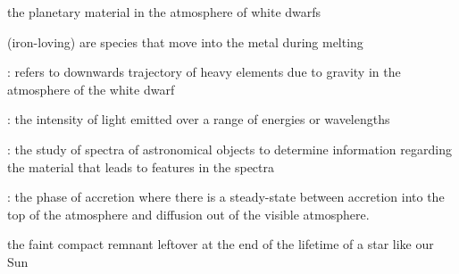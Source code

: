 \documentclass[onecolumn,authoryear]{els-mrw}
\begin{document}
\begin{glossary}[Glossary]
 the planetary material in the atmosphere of white dwarfs



 (iron-loving) are species that move into the metal during melting


: refers to downwards trajectory of heavy elements due to gravity in the atmosphere of the white dwarf  


: the intensity of light emitted over a range of energies or wavelengths



: the study of spectra of astronomical objects to determine information regarding the material that leads to features in the spectra



: the phase of accretion where there is a steady-state between accretion into the top of the atmosphere and diffusion out of the visible atmosphere. 

 the faint compact remnant leftover at the end of the lifetime of a star like our Sun 


\end{glossary}



\begin{abstract}[Abstract]
We live in an exoplanet revolution, with more than 5,000 exoplanets detected to date. Our ability to characterise individual exoplanets is constantly improving, with exquisite mass and radius measurements for an ever-growing sample of planets, complimented by atmospheric characterisation of lower and lower mass planets. This chapter outlines a complimentary set of observations that uniquely provide bulk elemental compositions for exoplanetary material. Absorption features from metals, including Mg, Fe, Si, O, Ca, Al, Ni and Ti in the white dwarf photosphere characterise the composition of accreted planetary material. These observations highlight the diversity in composition across exoplanetary systems including volatile content and probe key geological processes including the formation of iron cores. Thanks to the many white dwarfs identified by the space satellite {\it Gaia}, a revolution in the spectroscopic characterisation of white dwarfs is underway. 




\end{abstract}
\end{document}
